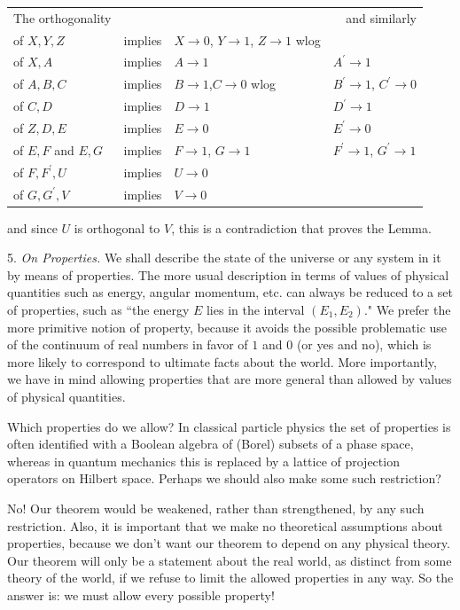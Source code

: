 \documentclass[12pt]{amsart}
\begin{document}
\begin{center}
\begin{tabular}{llll}
\multicolumn{1}{c}{The orthogonality}&
      \multicolumn{2}{c}{}&\multicolumn{1}{r}{and similarly}\\
of $X,Y,Z$ &implies&$X \to 0$, $Y\to 1$, $Z \to 1$ wlog& \\
of $X,A$&implies&$A\to 1$&$A^\prime \to 1$\\
of $A,B,C$&implies&$B\to 1$,$C\to 0$ wlog&$B^\prime \to 1$,
     $C^\prime \to 0$\\
of $C,D$&implies&$D \to 1$&$D^\prime \to 1$\\
of $Z,D,E$&implies&$E \to 0$&$E^\prime \to 0$\\
of $E, F$ and $E,G$&implies&$F \to 1$, $G\to 1$&$F^\prime \to 1$,
     $G^\prime \to 1$\\
of $F,F^\prime, U$&implies&$U \to 0$&\\
of $G,G^\prime, V$&implies&$V \to 0$&
\end{tabular}
\end{center}       
and since $U$ is orthogonal to $V$, this is a contradiction
that proves the Lemma.


5.  {\em On Properties.}
We shall describe the state of the universe or any system in it by
means of properties.  The more usual description in terms of values of
physical quantities such as energy, angular momentum, etc. can always be
reduced to a set of properties, such as ``the energy $E$ lies in the interval 
$(E_1 , E_2)$."  We prefer the more primitive notion of property, because it 
avoids the possible problematic use of the continuum of real numbers in favor 
of $1$ and $0$ (or yes and no), which is more likely to correspond to ultimate 
facts about the world.  More importantly, we have in mind allowing properties
that are more general than allowed by values of physical quantities.

Which properties do we allow?  In classical particle physics the set of
properties is often identified with a Boolean algebra of (Borel)
subsets of a phase space, whereas in quantum mechanics this is replaced
by a lattice of projection operators on Hilbert space. Perhaps we should 
also make some such restriction?

No!  Our theorem would be weakened, rather than strengthened, by any such
restriction.  Also, it is important that we make no theoretical assumptions
about properties, because we don't want our theorem to depend on any physical 
theory.  Our theorem will only be a statement about the real world, as distinct
from some theory of the world, if we refuse to limit the allowed properties in 
any way.  So the answer is: we must allow every possible property!
\end{document}
